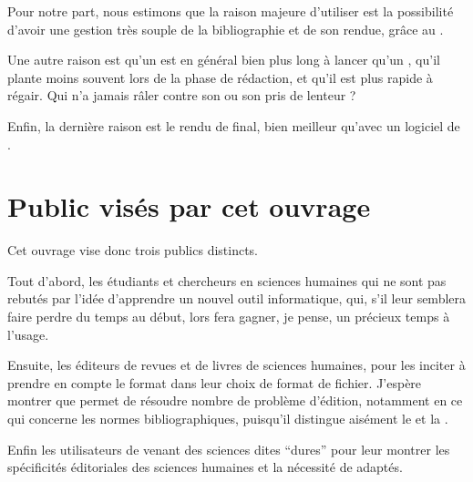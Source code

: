Pour notre part, nous estimons que la raison majeure d'utiliser \logiciel{\LaTeX} est la possibilité d'avoir une gestion très souple de la bibliographie et de son rendue, grâce au  . 

Une autre raison est qu'un  est en général bien plus long à lancer qu'un , qu'il plante moins souvent lors de la phase de rédaction, et qu'il est plus rapide à régair. Qui n'a jamais râler contre son  ou son  pris de lenteur ?

Enfin, la dernière raison est le rendu de \logiciel{\LaTeX}  final, bien meilleur qu'avec un logiciel de .


\section{Public visés par cet ouvrage}

Cet ouvrage vise donc trois publics distincts.

Tout d'abord, les étudiants et chercheurs en sciences humaines qui ne sont pas rebutés par l'idée d'apprendre un nouvel outil informatique, qui, s'il leur semblera faire perdre du temps au début, lors fera gagner, je pense, un précieux temps à l'usage.

Ensuite, les éditeurs de revues et de livres de sciences humaines, pour les inciter à prendre en compte le format \concept{\LaTeX} dans leur choix de format de fichier. J'espère montrer que \logiciel{\LaTeX} permet de résoudre nombre de problème d'édition, notamment en ce qui concerne les normes bibliographiques, puisqu'il distingue aisément le  et la .

Enfin les utilisateurs de \logiciel{\LaTeX} venant des sciences dites \enquote{dures} pour leur montrer les spécificités éditoriales des sciences humaines et la nécessité de  adaptés.

